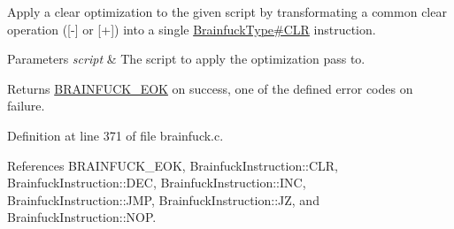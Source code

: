 Apply a \textquotesingle{}clear\textquotesingle{} optimization to the given script by transformating a common clear operation (\mbox{[}-\/\mbox{]} or \mbox{[}+\mbox{]}) into a single \hyperlink{}{Brainfuck\+Type\#\+C\+L\+R} instruction. 


\begin{DoxyParams}{Parameters}
{\em script} & The script to apply the optimization pass to. \\
\hline
\end{DoxyParams}
\begin{DoxyReturn}{Returns}
\hyperlink{group__definitions_ga8bfac4ba16ff2a9367ec92a3b9786599}{B\+R\+A\+I\+N\+F\+U\+C\+K\+\_\+\+E\+O\+K} on success, one of the defined error codes on failure. 
\end{DoxyReturn}


Definition at line 371 of file brainfuck.\+c.



References B\+R\+A\+I\+N\+F\+U\+C\+K\+\_\+\+E\+O\+K, Brainfuck\+Instruction\+::\+C\+L\+R, Brainfuck\+Instruction\+::\+D\+E\+C, Brainfuck\+Instruction\+::\+I\+N\+C, Brainfuck\+Instruction\+::\+J\+M\+P, Brainfuck\+Instruction\+::\+J\+Z, and Brainfuck\+Instruction\+::\+N\+O\+P.

